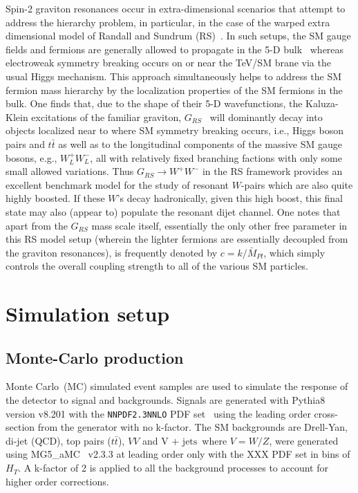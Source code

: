 \documentclass[a4paper,11pt]{article}
\newcommand*{\hht}{\ensuremath{H_{\ensuremath{T}}}}
\newcommand*{\vj}{\ensuremath{\text{V + jets}}}
\newcommand*{\ttbar}{\ensuremath{t\bar{t}}}
\newcommand*{\MGAMC}{\textsc{MG5}\_aMC}
\newcommand{\py}{{\sc Pythia8}}
\newcommand*{\pdf}[1]{\texttt{#1}}
\begin{document}
Spin-2 graviton resonances occur in extra-dimensional scenarios that attempt to address the hierarchy problem, in particular, in the case of the warped extra dimensional model of
Randall and Sundrum (RS)~\cite{Randall:1999ee}. In such setups, the SM gauge fields and fermions are generally allowed to propagate in the 5-D
bulk~\cite{Pomarol:1999ad,Davoudiasl:1999tf,Grossman:1999ra,Davoudiasl:2000wi,Gherghetta:2000qt} whereas electroweak symmetry breaking occurs on or near the TeV/SM brane
via the usual Higgs mechanism. This approach simultaneously helps to address the SM fermion mass hierarchy by the localization properties of the SM fermions in the bulk.
One finds that, due to the shape of their 5-D wavefunctions, the Kaluza-Klein excitations of the familiar graviton, $G_{RS}$~\cite{Davoudiasl:1999jd} will dominantly decay into
objects localized near to where SM symmetry breaking occurs, i.e., Higgs boson pairs and $t\bar t$ as well as to the longitudinal components of the massive SM gauge bosons, e.g.,
$W^+_L W^-_L$, all with relatively fixed branching factions with only some small allowed variations. Thus $G_{RS}\rightarrow
W^+W^-$ in the RS framework provides an excellent benchmark model for the study of resonant $W$-pairs which are also quite highly boosted. If these $W$'s decay hadronically,
given this high boost, this final state may also (appear to) populate the resonant dijet channel. One notes that apart from the $G_{RS}$ mass scale itself, essentially the only other
free parameter in this RS model setup (wherein the lighter fermions are essentially decoupled from the graviton resonances), is frequently denoted by $c=k/\bar M_{Pl}$, which simply
controls the overall coupling strength to all of the various SM particles.


\section{Simulation setup}
\label{sec:simulation}

\subsection{Monte-Carlo production}
\label{subsec:mcprod}

Monte Carlo~(MC) simulated event samples are used to simulate the response of the detector to signal and backgrounds. Signals are generated with \py~\cite{Sjostrand:2014zea} version v8.201 with the \pdf{NNPDF2\!.\!3NNLO} PDF set~\cite{Ball:2014uwa} using the leading order cross-section from the generator with no k-factor. 
The SM backgrounds are Drell-Yan, di-jet (QCD), top pairs (\ttbar), $VV$ and \vj\ where $V=W/Z$,  were generated using \MGAMC~\cite{Alwall:2014hca} v2.3.3 at leading order only with the XXX PDF set in bins of $\hht$. A k-factor of 2 is applied to all the background processes to account for higher order corrections.
\end{document}
